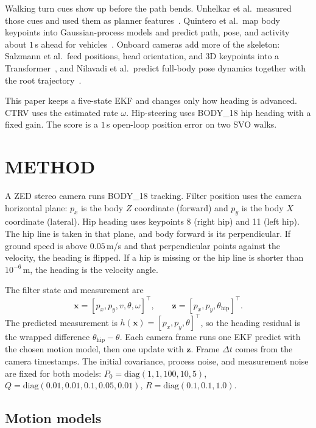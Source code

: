 \documentclass[letterpaper, 10pt, conference]{IEEEtran}
\begin{document}
Walking turn cues show up before the path bends. Unhelkar et al.\ measured
those cues and used them as planner features~\cite{unhelkar2015anticipatory}.
Quintero et al.\ map body keypoints into Gaussian-process models and
predict path, pose, and activity about $1$\,s ahead for
vehicles~\cite{quintero2018path}. Onboard cameras add more of the skeleton:
Salzmann et al.\ feed positions, head orientation, and 3D keypoints into a
Transformer~\cite{salzmann2023robots}, and Nilavadi et al.\ predict
full-body pose dynamics together with the root trajectory~\cite{uptor2025}.

This paper keeps a five-state EKF and changes only how heading is advanced.
CTRV uses the estimated rate $\omega$. Hip-steering uses BODY\_18 hip
heading with a fixed gain. The score is a $1$\,s open-loop position error
on two SVO walks.

\section{METHOD}

A ZED stereo camera runs BODY\_18 tracking. Filter position uses the camera
horizontal plane: $p_x$ is the body $Z$ coordinate (forward) and $p_y$ is
the body $X$ coordinate (lateral). Hip heading uses keypoints 8 (right hip)
and 11 (left hip). The hip line is taken in that plane, and body forward is
its perpendicular. If ground speed is above $0.05$\,m/s and that
perpendicular points against the velocity, the heading is flipped. If a hip
is missing or the hip line is shorter than $10^{-6}$\,m, the heading is the
velocity angle.

The filter state and measurement are
\begin{equation}
\mathbf{x}=[p_x,p_y,v,\theta,\omega]^\top,\qquad
\mathbf{z}=[p_x,p_y,\theta_{\mathrm{hip}}]^\top.
\end{equation}
The predicted measurement is $h(\mathbf{x})=[p_x,p_y,\theta]^\top$, so the
heading residual is the wrapped difference $\theta_{\mathrm{hip}}-\theta$.
Each camera frame runs one EKF predict with the chosen motion model, then
one update with $\mathbf{z}$. Frame $\Delta t$ comes from the camera
timestamps. The initial covariance, process noise, and measurement noise
are fixed for both models:
$P_0=\mathrm{diag}(1,1,100,10,5)$,
$Q=\mathrm{diag}(0.01,0.01,0.1,0.05,0.01)$,
$R=\mathrm{diag}(0.1,0.1,1.0)$.

\subsection{Motion models}
\end{document}
